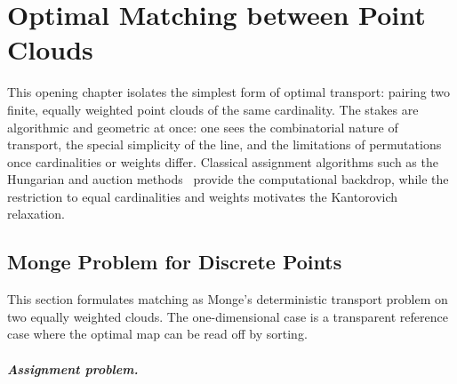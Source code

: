 
\chapter{Optimal Matching between Point Clouds}
\label{sec-matching}

This opening chapter isolates the simplest form of optimal transport: pairing two finite, equally weighted point clouds of the same cardinality. The stakes are algorithmic and geometric at once: one sees the combinatorial nature of transport, the special simplicity of the line, and the limitations of permutations once cardinalities or weights differ. Classical assignment algorithms such as the Hungarian and auction methods~\cite{Kuhn1955,bertsekas1992auction} provide the computational backdrop, while the restriction to equal cardinalities and weights motivates the Kantorovich relaxation.

\section{Monge Problem for Discrete Points}
\label{sec-monge-pbm}

This section formulates matching as Monge's deterministic transport problem on two equally weighted clouds. The one-dimensional case is a transparent reference case where the optimal map can be read off by sorting.

\paragraph{Assignment problem.}

